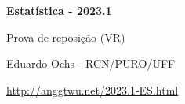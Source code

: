 \documentclass[oneside,12pt]{article}
\begin{document}
\pu

\def\minibalas#1{{
  \unitlength=5pt
  \setdotdims{0.5}{0.2}
  \scalebox{0.7}{$
    \ga{#1}
  $}}}
\def\MBA#1#2#3{#1 \; ⇒ \; \minibalas{#2}}
\def\MBB#1#2#3{P(#1) = #3}
\def\MBC#1#2#3{\begin{array}{rcl}
   #1\phantom{i} &⇒& \minibalas{#2} \\[-2pt]
  P(#1) &=& #3 \\
  \end{array}}





\pu




%

\thispagestyle{empty}

\begin{center}

\vspace*{1.2cm}

{\bf \Large Estatística - 2023.1}

\bsk

Prova de reposição (VR)

\bsk

Eduardo Ochs - RCN/PURO/UFF

\url{http://anggtwu.net/2023.1-ES.html}

\end{center}
\end{document}

